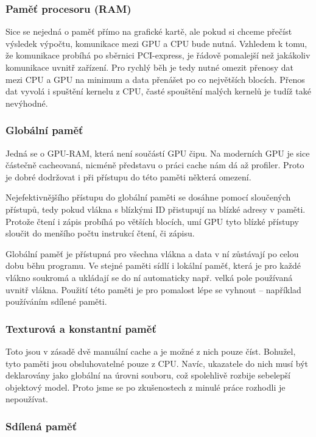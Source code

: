 \subsubsection{Paměť procesoru (RAM)}

Sice se nejedná o paměť přímo na grafické kartě, ale pokud si chceme přečíst výsledek výpočtu, komunikace mezi GPU a CPU bude nutná. Vzhledem k tomu, že komunikace probíhá po sběrnici PCI-express, je řádově pomalejší než jakákoliv komunikace uvnitř zařízení. Pro rychlý běh je tedy nutné omezit přenosy dat mezi CPU a GPU na minimum a data přenášet po co největších blocích. Přenos dat vyvolá i spuštění kernelu z CPU, časté spouštění malých kernelů je tudíž také nevýhodné.

\subsubsection{Globální paměť}

Jedná se o GPU-RAM, která není součástí GPU čipu. Na moderních GPU je sice částečně cacheovaná, nicméně představu o práci cache nám dá až profiler. Proto je dobré dodržovat i při přístupu do této paměti některá omezení.

Nejefektivnějšího přístupu do globální paměti se dosáhne pomocí sloučených přístupů, tedy pokud vlákna s blízkými ID přistupují na blízké adresy v paměti. Protože čtení i zápis probíhá po větších blocích, umí GPU tyto blízké přístupy sloučit do menšího počtu instrukcí čtení, či zápisu.

Globální paměť je přístupná pro všechna vlákna a data v ní zůstávají po celou dobu běhu programu. Ve stejné paměti sídlí i lokální paměť, která je pro každé vlákno soukromá a ukládají se do ní automaticky např. velká pole používaná uvnitř vlákna. Použití této paměti je pro pomalost lépe se vyhnout -- například používáním sdílené paměti.

\subsubsection{Texturová a konstantní paměť}

Toto jsou v zásadě dvě manuální cache a je možné z nich pouze číst. Bohužel, tyto paměti jsou obsluhovatelné pouze z CPU. Navíc, ukazatele do nich musí být deklarovány jako globální na úrovni souboru, což spolehlivě rozbije sebelepší objektový model. Proto jsme se po zkušenostech z minulé práce  rozhodli je nepoužívat.

\subsubsection{Sdílená paměť}

